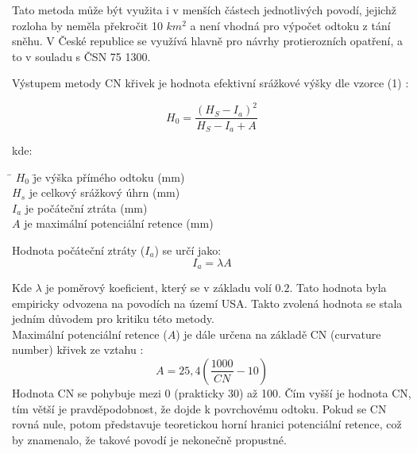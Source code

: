 \documentclass[a4paper,oneside,12pt]{book}
\begin{document}
\hspace{10mm} Tato metoda může být využita i v menších částech jednotlivých povodí, jejichž rozloha by neměla překročit 10 $km^{2}$ a není vhodná pro výpočet odtoku z tání sněhu. V České republice se využívá hlavně pro návrhy protierozních opatření, a to v souladu s ČSN 75 1300. \cite{MNYDGwleJOjKdRUp}

Výstupem metody CN křivek je hodnota efektivní srážkové výšky dle vzorce (1) \cite{MNYDGwleJOjKLRU2}:


\begin{equation}
H_{0} = \frac{\displaystyle (H_{S} - I_{a})^{2}}{\displaystyle H_{S} - I_{a} + A}
\end{equation}

kde:
\begin{tabbing}
    \hspace{10mm} \= $H_{0}$ \hspace{5mm} \= je výška přímého odtoku (mm) \\
    \> $H_{s}$ \> je celkový srážkový úhrn (mm) \\
    \> $I_{a}$ \> je počáteční ztráta (mm) \\
    \> $A$ \> je maximální potenciální retence (mm)
\end{tabbing}

Hodnota počáteční ztráty ($I_{a}$) se určí jako:
\begin{equation}
I_{a} = \lambda A
\end{equation}

\hspace{10mm} Kde $\lambda$ je poměrový koeficient, který se v základu volí $0.2$. Tato hodnota byla empiricky odvozena na povodích na území USA. \cite{Lian2020}\cite{MNYDGwleJOjKLRU2} Takto zvolená hodnota se stala jedním důvodem pro kritiku této metody. \cite{MNYDGwleJOjKLRUp} \\

\hspace{10mm} Maximální potenciální retence ($A$) je dále určena na základě CN (curvature number) křivek ze vztahu \cite{MNYDGwleJOjKdRUp} : 
\begin{equation}
A = 25,4 (\frac{1000}{CN}-10)
\end{equation}
\hspace{10mm} Hodnota CN se pohybuje mezi 0 (prakticky 30) až 100. Čím vyšší je hodnota CN, tím větší je pravděpodobnost, že dojde k povrchovému odtoku. Pokud se CN rovná nule, potom představuje teoretickou horní
hranici potenciální retence, což by znamenalo, že takové povodí je nekonečně propustné. \cite{MNYDGwleJOjKLRU3}
\end{document}

